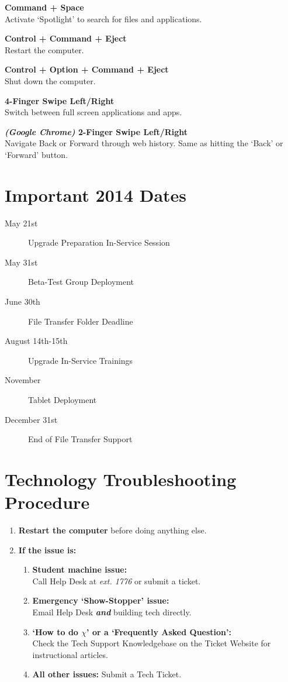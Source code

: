 \documentclass[10pt,foldmark,notumble]{leaflet}
\begin{document}
\textbf{Command + Space}\\
Activate `Spotlight' to search for files and applications.

\textbf{Control + Command + Eject}\\
Restart the computer.

\textbf{Control + Option + Command + Eject}\\
Shut down the computer.

\textbf{4-Finger Swipe Left/Right}\\
Switch between full screen applications and apps.

\textbf{\emph{(Google Chrome)} 2-Finger Swipe Left/Right}\\
Navigate Back or Forward through web history. Same as hitting the `Back' or `Forward' button.

\section{Important 2014 Dates\color{red}\hrulefill\color{black}}
\begin{description}
\item[May 21st] \dotfill Upgrade Preparation In-Service Session
\item[May 31st] \dotfill Beta-Test Group Deployment
\item[June 30th] \dotfill File Transfer Folder Deadline
\item[August 14th-15th] \dotfill Upgrade In-Service Trainings
\item[November] \dotfill Tablet Deployment
\item[December 31st] \dotfill End of File Transfer Support
\end{description}

\section{Technology Troubleshooting Procedure\color{red}\hrulefill\color{black}}
\begin{enumerate}
	\item \textbf{Restart the computer} before doing anything else.
	\item \textbf{If the issue is:}
		\begin{enumerate}
			\item \textbf{Student machine issue:}\\Call Help Desk at \emph{ext. 1776} or submit a ticket.
			\item \textbf{Emergency `Show-Stopper' issue:}\\Email Help Desk \textbf{\emph{and}} building tech directly.
			\item \textbf{`How to do $\chi$' or a `Frequently Asked Question':}\\Check the Tech Support Knowledgebase on the Ticket Website for instructional articles.
			\item \textbf{All other issues:} Submit a Tech Ticket.
		\end{enumerate}
\end{enumerate}
\end{document}
